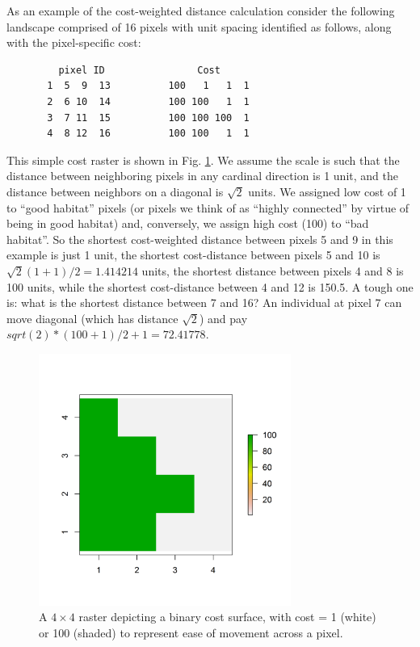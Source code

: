 As an example of the cost-weighted distance calculation consider the
following landscape comprised of 16 pixels with unit spacing
identified as follows, along with the pixel-specific cost:
\begin{center}
\begin{verbatim}
         pixel ID                Cost
       1  5  9  13          100   1   1  1
       2  6 10  14          100 100   1  1
       3  7 11  15          100 100 100  1
       4  8 12  16          100 100   1  1
\end{verbatim}
\end{center}
This simple cost raster is shown in Fig. \ref{ecoldist.fig.raster}. We
assume the scale is such that the distance between neighboring pixels
in any cardinal direction is 1 unit, and the distance between
neighbors on a diagonal is $\sqrt{2}$ units.  We assigned low cost of
1 to ``good habitat'' pixels (or pixels we think of as ``highly
connected'' by virtue of being in good habitat) and, conversely, we
assign high cost (100) to ``bad habitat''. So the shortest
cost-weighted distance between pixels 5 and 9 in this example is just
1 unit, the shortest cost-distance between pixels 5 and 10 is
$\sqrt{2}(1+1)/2 = 1.414214$ units, the shortest distance between
pixels 4 and 8 is 100 units, while the shortest cost-distance between
4 and 12 is 150.5. A tough one is: what is the shortest distance
between 7 and 16? An individual at pixel 7 can move diagonal (which
has distance $\sqrt{2}$) and pay $sqrt(2)*(100+1)/2 + 1 =72.41778$.

\begin{figure}[h]
\begin{center}
\includegraphics[height=3.25in,width=3.25in]{Ch10-EcolDist/figs/raster_2values}
\end{center}
\caption{A $4 \times 4$ raster depicting a binary cost surface, with cost = 1 (white) or 100 (shaded) to represent ease of movement across a pixel.}
\label{ecoldist.fig.raster}
\end{figure}


